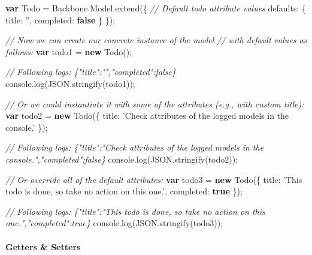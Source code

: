 \documentclass[9pt]{book}
\newenvironment{Shaded}{}{}
\newcommand{\KeywordTok}[1]{\textcolor[rgb]{0.00,0.44,0.13}{\textbf{{#1}}}}
\newcommand{\DataTypeTok}[1]{\textcolor[rgb]{0.56,0.13,0.00}{{#1}}}
\newcommand{\StringTok}[1]{\textcolor[rgb]{0.25,0.44,0.63}{{#1}}}
\newcommand{\CommentTok}[1]{\textcolor[rgb]{0.38,0.63,0.69}{\textit{{#1}}}}
\newcommand{\OtherTok}[1]{\textcolor[rgb]{0.00,0.44,0.13}{{#1}}}
\newcommand{\FunctionTok}[1]{\textcolor[rgb]{0.02,0.16,0.49}{{#1}}}
\newcommand{\NormalTok}[1]{{#1}}
\begin{document}
\begin{Shaded}
\begin{Highlighting}[]
\KeywordTok{var} \NormalTok{Todo = }\OtherTok{Backbone}\NormalTok{.}\OtherTok{Model}\NormalTok{.}\FunctionTok{extend}\NormalTok{(\{}
  \CommentTok{// Default todo attribute values}
  \DataTypeTok{defaults}\NormalTok{: \{}
    \DataTypeTok{title}\NormalTok{: }\StringTok{''}\NormalTok{,}
    \DataTypeTok{completed}\NormalTok{: }\KeywordTok{false}
  \NormalTok{\}}
\NormalTok{\});}

\CommentTok{// Now we can create our concrete instance of the model}
\CommentTok{// with default values as follows:}
\KeywordTok{var} \NormalTok{todo1 = }\KeywordTok{new} \FunctionTok{Todo}\NormalTok{();}

\CommentTok{// Following logs: \{"title":"","completed":false\}}
\OtherTok{console}\NormalTok{.}\FunctionTok{log}\NormalTok{(}\OtherTok{JSON}\NormalTok{.}\FunctionTok{stringify}\NormalTok{(todo1));}

\CommentTok{// Or we could instantiate it with some of the attributes (e.g., with custom title):}
\KeywordTok{var} \NormalTok{todo2 = }\KeywordTok{new} \FunctionTok{Todo}\NormalTok{(\{}
  \DataTypeTok{title}\NormalTok{: }\StringTok{'Check attributes of the logged models in the console.'}
\NormalTok{\});}

\CommentTok{// Following logs: \{"title":"Check attributes of the logged models in the console.","completed":false\}}
\OtherTok{console}\NormalTok{.}\FunctionTok{log}\NormalTok{(}\OtherTok{JSON}\NormalTok{.}\FunctionTok{stringify}\NormalTok{(todo2));}

\CommentTok{// Or override all of the default attributes:}
\KeywordTok{var} \NormalTok{todo3 = }\KeywordTok{new} \FunctionTok{Todo}\NormalTok{(\{}
  \DataTypeTok{title}\NormalTok{: }\StringTok{'This todo is done, so take no action on this one.'}\NormalTok{,}
  \DataTypeTok{completed}\NormalTok{: }\KeywordTok{true}
\NormalTok{\});}

\CommentTok{// Following logs: \{"title":"This todo is done, so take no action on this one.","completed":true\} }
\OtherTok{console}\NormalTok{.}\FunctionTok{log}\NormalTok{(}\OtherTok{JSON}\NormalTok{.}\FunctionTok{stringify}\NormalTok{(todo3));}
\end{Highlighting}
\end{Shaded}

\paragraph{Getters \& Setters}\label{getters-setters}
\end{document}
